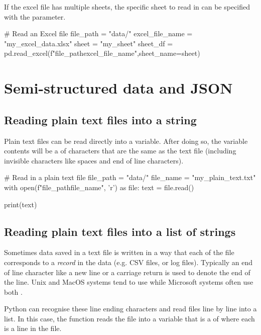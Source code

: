 If the excel file has multiple sheets, the specific sheet to read in can be specified with the  parameter.

\begin{pycode}
    # Read an Excel file
    file_path = "data/"
    excel_file_name = "my_excel_data.xlsx"
    sheet = "my_sheet"
    sheet_df = pd.read_excel(f"{file_path}{excel_file_name}",sheet_name=sheet)
\end{pycode}

\newpage
\section{Semi-structured data and JSON}

\subsection{Reading plain text files into a string}

Plain text files can be read directly into a variable. After doing so, the variable contents will be a  of characters that are the same as the text file (including invisible characters like spaces and end of line characters).

\begin{pycode}
    # Read in a plain text file
    file_path = "data/"
    file_name = "my_plain_text.txt"
    with open(f"{file_path}{file_name}", 'r') as file:
    text = file.read()

    print(text)
\end{pycode}

\subsection{Reading plain text files into a list of strings}

Sometimes data saved in a text file is written in a way that each  of the file corresponds to a \textit{record} in the data (e.g. CSV files, or log files). Typically an end of line character like a new line \code{\n} or a carriage return \code{\r} is used to denote the end of the line. Unix and MacOS systems tend to use \code{\n} while Microsoft systems often use both \code{\n\r}.

Python can recognise these line ending characters and read files line by line into a list. In this case, the  function reads the file into a variable that is a  of  where each  is a line in the file.

